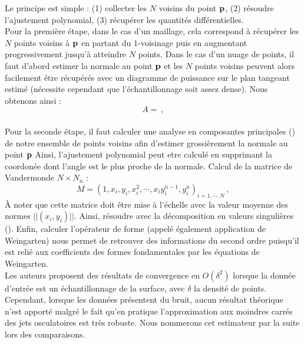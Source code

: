 Le principe est simple : (1) collecter les $N$ voisins du point $\mathbf{p}$, (2)
résoudre l'ajustement polynomial, (3) récupérer les quantités différentielles.
%
\\
%
Pour la première étape, dans le cas d'un maillage, cela correspond à récupérer
les $N$ points voisins à $\mathbf{p}$ en partant du $1$-voisinage puis en augmentant
progressivement jusqu'à atteindre $N$ points. Dans le cas d'un nuage de points,
il faut d'abord estimer la normale au point $\mathbf{p}$ et les $N$ points voisins
peuvent alors facilement être récupérés avec un diagramme de puissance sur le
plan tangeant estimé (nécessite cependant que l'échantillonnage soit assez
dense). Nous obtenons ainsi :
%
\begin{equation}
  A =  \,,
\end{equation}
%
\\
%
Pour la seconde étape, il faut calculer une analyse en composantes principales
(\ACP) de notre ensemble de points voisins afin d'estimer grossièrement la
normale au point $\mathbf{p}$ Ainsi, l'ajustement polynomial peut etre calculé en
supprimant la coordonée dont l'angle est le plus proche de la normale. Calcul de
la matrice de Vandermonde $N \times N_n$ :
%
\begin{equation}
  M =  (1,x_i, y_i, x^2_i, \cdots, x_iy_i^{n-1}, y_i^n)_{i=1,\cdots,N} \,,
\end{equation}
%
À noter que cette matrice doit être mise à l'échelle avec la valeur moyenne des
normes $||(x_i,y_i)||$. Ainsi, résoudre avec la décomposition en valeurs singulières
().
%
%
%
Enfin, calculer l'opérateur de forme (appelé également application de
Weingarten) nous permet de retrouver des informations du second ordre puisqu'il
est relié aux coefficients des formes fondamentales par les équations de
Weingarten.
%
\\
%
Les auteurs proposent des résultats de convergence en $O(\delta^2)$ lorsque la
donnée d'entrée est un échantillonnage de la surface, avec $\delta$ la densité
de points. Cependant, lorsque les données présentent du bruit, aucun résultat
théorique n'est apporté malgré le fait qu'en pratique l'approximation aux
moindres carrés des jets osculatoires est très robuste.
%
Nous nommerons cet estimateur par la suite \JetFitting lors des comparaisons.
%
